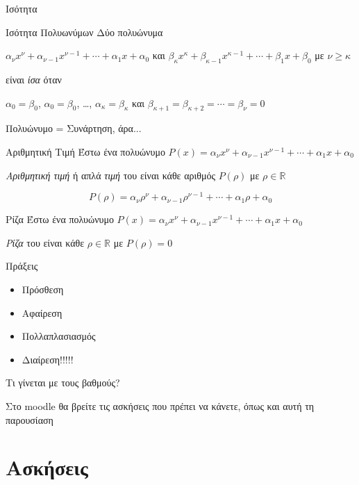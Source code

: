 \documentclass{../presentation}
\begin{document}
\begin{frame}{Ισότητα}
  \begin{block}{Ισότητα Πολυωνύμων}
    Δύο πολυώνυμα

    $α_νx^ν+α_{ν-1}x^{ν-1}+\cdots+α_1x+α_0$ και $β_κx^κ+β_{κ-1}x^{κ-1}+\cdots+β_1x+β_0$ με $ν\ge κ$

    είναι \emph{ίσα} όταν

    $α_0=β_0$, $α_0=β_0$, \ldots, $α_κ=β_κ$ και $β_{κ+1}=β_{κ+2}=\cdots=β_ν=0$
  \end{block}
\end{frame}

\begin{frame}{Πολυώνυμο = Συνάρτηση, άρα...}
  \begin{block}{Αριθμητική Τιμή}
    Έστω ένα πολυώνυμο $P(x)=α_νx^ν+α_{ν-1}x^{ν-1}+\cdots+α_1x+α_0$

    \emph{Αριθμητική τιμή} ή απλά \emph{τιμή} του είναι κάθε αριθμός $P(ρ)$ με $ρ\in\mathbb{R}$

    $$P(ρ)=α_νρ^ν+α_{ν-1}ρ^{ν-1}+\cdots+α_1ρ+α_0$$
  \end{block}

  \begin{block}{Ρίζα}
    Έστω ένα πολυώνυμο $P(x)=α_νx^ν+α_{ν-1}x^{ν-1}+\cdots+α_1x+α_0$

    \emph{Ρίζα} του είναι κάθε $ρ\in\mathbb{R}$ με $P(ρ)=0$
  \end{block}
\end{frame}

\begin{frame}{Πράξεις}
  \begin{block}{}
    \begin{itemize}
      \item<1-> Πρόσθεση
      \item<2-> Αφαίρεση
      \item<3-> Πολλαπλασιασμός
      \item<4-> Διαίρεση!!!!!
    \end{itemize}
  \end{block}
   Τι γίνεται με τους βαθμούς?
\end{frame}

\begin{frame}[noframenumbering]
  Στο moodle θα βρείτε τις ασκήσεις που πρέπει να κάνετε, όπως και αυτή τη παρουσίαση
\end{frame}

\section{Ασκήσεις}
\end{document}
